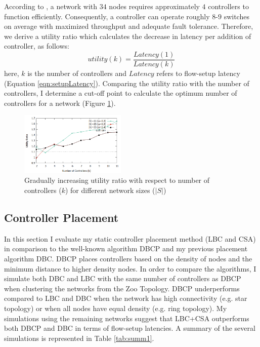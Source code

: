 \documentclass{IEEEtran}
\begin{document}
	According to \cite{cpp2012heller}, a network with $34$ nodes requires approximately $4$ controllers to function efficiently. Consequently, a controller can operate roughly $8$-$9$ switches  on average with maximized throughput and adequate fault tolerance. Therefore, we derive a utility ratio which calculates the decrease in latency per addition of controller, as follows:
	\begin{equation}
		utility(k) = \frac{Latency(1)}{Latency(k)}
	\end{equation}
	here, $k$ is the number of controllers and $Latency$ refers to flow-setup latency (Equation \ref{eqn:setupLatency}). Comparing the utility ratio with the number of controllers, I determine a cut-off point to calculate the optimum number of controllers for a network (Figure \ref{fig:cutoff}).
	
	\begin{figure}
		\centering
		\includegraphics[width=0.45\textwidth]{Images/cutoff.png}
		\caption{Gradually increasing utility ratio with respect to number of controllers ($k$) for different network sizes ($|S|$)} \label{fig:cutoff}
	\end{figure}
	
	\subsection{Controller Placement} \label{CPAnalysis}
	In this section I evaluate my static controller placement method (LBC and CSA) in comparison to the well-known algorithm DBCP and my previous placement algorithm DBC. DBCP places controllers based on the density of nodes and the minimum distance to higher density nodes. In order to compare the algorithms, I simulate both DBC and LBC with the same number of controllers as DBCP when clustering the networks from the Zoo Topology. DBCP underperforms compared to LBC and DBC when the network has high connectivity (e.g. star topology) or when all nodes have equal density (e.g. ring topology). My simulations using the remaining networks suggest that LBC+CSA outperforms both DBCP and DBC in terms of flow-setup latencies. A summary of the several simulations is represented in Table \ref{tab:summ1}.
	
\end{document}

